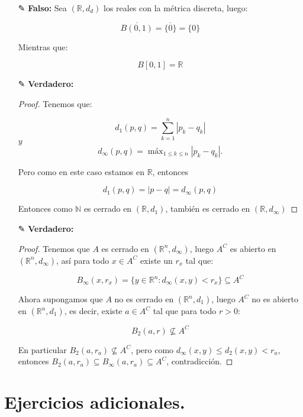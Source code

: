 \begin{itemize}
    \item[✎] \textbf{Falso: }Sea $(\mathbb{R},d_d)$ los reales con la métrica discreta, luego:

    $$\overline{B(0,1)}=\overline{\{0\}}=\{0\}$$

Mientras que:

$$B[0,1]=\mathbb{R}$$

    \item[✎]\textbf{Verdadero: }\\
    \begin{proof}
        Tenemos que: 

    $$
d_1(p, q)=\sum_{k=1}^n\left|p_k-q_k\right|
$$
$y$
$$
d_{\infty}(p, q)=\operatorname{máx}_{1 \leq k \leq n}\left|p_k-q_k\right| .
$$

Pero como en este caso estamos en $\mathbb{R}$, entonces 

$$
d_1(p, q)=|p-q|=d_{\infty}(p,q)
$$

Entonces como $\mathbb{N}$ es cerrado en $(\mathbb{R},d_1)$, también es cerrado en $(\mathbb{R},d_{\infty})$

    \end{proof}

    \item[✎]\textbf{Verdadero: }\\
    
   \begin{proof}
         Tenemos que $A$ es cerrado en $(\mathbb{R}^n,d_{\infty})$, luego $A^C$ es abierto en $(\mathbb{R}^n,d_{\infty})$, así para todo $x\in A^C$ existe un $r_x$ tal que:

         $$B_{\infty}(x,r_x)=\{y\in \mathbb{R}^n: d_{\infty}(x,y)<r_x\}\subseteq A^C$$

         Ahora supongamos que $A$ no es cerrado en $(\mathbb{R}^n,d_1)$, luego $A^C$ no es abierto en $(\mathbb{R}^n,d_1)$, es decir, existe $a \in A^C$ tal que para todo $r>0$:

         $$B_2(a,r)\not \subseteq A^C$$

         En particular $B_2(a,r_a)\not \subseteq A^C$, pero como $d_{\infty}(x,y)\leq d_2(x,y)<r_a$, entonces $B_2(a,r_a)\subseteq B_{\infty}(a,r_a)\subseteq A^C$, contradicción.
         
    \end{proof}
    
   

    
\end{itemize}
\vspace{0.3cm}
 \section{Ejercicios adicionales.}
    
